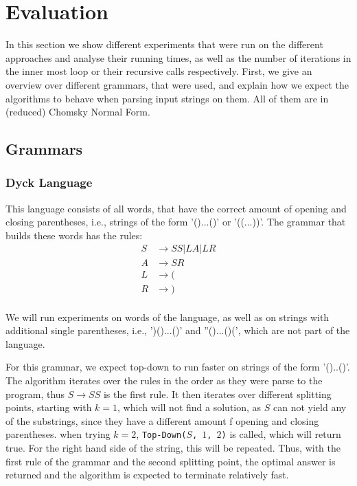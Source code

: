 \section{Evaluation}
\label{sec:Evaluation}
In this section we show different experiments that were run on the different approaches and analyse their running times, as well as the number of iterations in the inner most loop or their recursive calls respectively.
First, we give an overview over different grammars, that were used, and explain how we expect the algorithms to behave when parsing input strings on them.
All of them are in (reduced) Chomsky Normal Form.

\subsection{Grammars}
\subsubsection{Dyck Language}
This language consists of all words, that have the correct amount of opening and closing parentheses, i.e., strings of the form '()...()' or '((...))'.
The grammar that builds these words has the rules:
\begin{align*}
    S&\rightarrow SS|LA|LR\\
    A&\rightarrow SR\\
    L&\rightarrow (\\
    R&\rightarrow )\\
\end{align*}

We will run experiments on words of the language, as well as on strings with additional single parentheses, i.e., ')()...()' and ''()...()(', which are not part of the language.

For this grammar, we expect top-down to run faster on strings of the form '()..()'.
The algorithm iterates over the rules in the order as they were parse to the program, thus $S\rightarrow SS$ is the first rule.
It then iterates over different splitting points, starting with $k=1$, which will not find a solution, as $S$ can not yield any of the substrings, since they have a different amount f opening and closing parentheses.
when trying $k=2$, \texttt{Top-Down($S$, $1$, $2$)} is called, which will return true.
For the right hand side of the string, this will be repeated.
Thus, with the first rule of the grammar and the second splitting point, the optimal answer is returned and the algorithm is expected to terminate relatively fast.

